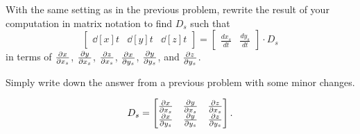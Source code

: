 \documentclass{ximera}
\begin{document}
\begin{problem}
  With the same setting as in the previous problem, rewrite the result
  of your computation in matrix notation to find $D_s$
  such that
\[
\begin{bmatrix}
\dd[x]{t} & \dd[y]{t} & \dd[z]{t}
\end{bmatrix}
=
\begin{bmatrix}
\frac{dx_s}{dt} & \frac{dy_s}{dt}
\end{bmatrix}\cdot D_s
\]
in terms of $\pp[x]{x_s}$, $\pp[y]{x_s}$, $\pp[z]{x_s}$,
$\pp[x]{y_s}$, $\pp[y]{y_s}$, and $\pp[z]{y_s}$.
\begin{hint}
  Simply write down the answer from a previous problem with some minor
  changes.
\end{hint}
\begin{freeResponse}
  \[
  D_s =
  \begin{bmatrix}
    \pp[x]{x_s} & \pp[y]{x_s} & \pp[z]{x_s} \\
    \pp[x]{y_s}   & \pp[y]{y_s}   & \pp[z]{y_s}
  \end{bmatrix}.
  \]
\end{freeResponse}
\end{problem}
\end{document}

